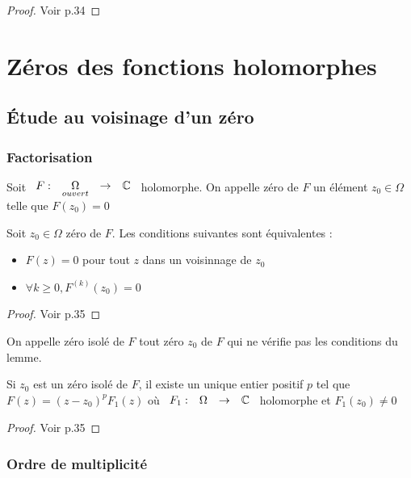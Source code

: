 \documentclass[]{report}
\begin{document}
\begin{proof}
    Voir p.34
\end{proof}

\chapter{Zéros des fonctions holomorphes}

\section{Étude au voisinage d'un zéro}

\subsection{Factorisation}

Soit $\begin{array}{ccccc} F : & \underset{ouvert}{\Omega} & \to & \mathbb{C} \end{array}$ holomorphe. On appelle zéro de $F$ un élément $z_0\in\Omega$ telle que $F(z_0)=0$


\begin{lm}
    Soit $z_0\in\Omega$ zéro de $F$. Les conditions suivantes sont équivalentes :\\
    \begin{itemize}
        \item $F(z)=0$ pour tout $z$ dans un voisinnage de $z_0$
        \item $\forall k\ge 0,F^{(k)}(z_0)=0$
    \end{itemize}
\end{lm}

\begin{proof}
    Voir p.35
\end{proof}

\begin{df}
    On appelle zéro isolé de $F$ tout zéro $z_0$ de $F$ qui ne vérifie pas les conditions du lemme.
\end{df}

\begin{prop}
    Si $z_0$ est un zéro isolé de $F$, il existe un unique entier positif $p$ tel que $F(z)=(z-z_0)^pF_1(z)$ où $\begin{array}{ccccc} F_1 : & \Omega & \to & \mathbb{C} \end{array}$ holomorphe et $F_1(z_0)\neq 0$
\end{prop}

\begin{proof}
    Voir p.35
\end{proof}

\subsection{Ordre de multiplicité}
\end{document}
